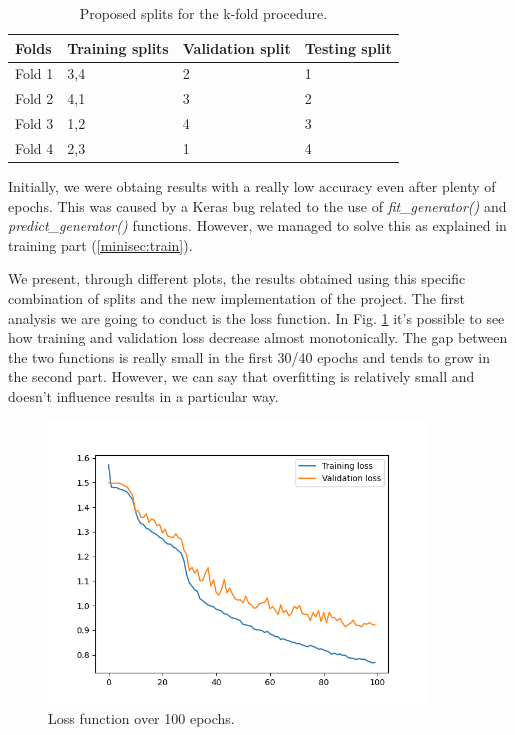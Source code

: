 \documentclass[11pt]{article}
\begin{document}
    

\begin{table}[h]
\caption{Proposed splits for the k-fold procedure.}
\centering
\begin{tabular}{l|lll}

Folds  & \multicolumn{1}{l|}{Training splits} & \multicolumn{1}{l|}{Validation split} & Testing split \\ \hline

Fold 1 & 3,4                                  & 2                                     & 1             \\

Fold 2 & 4,1                                  & 3                                     & 2             \\

Fold 3 & 1,2                                  & 4                                     & 3             \\
 
Fold 4 & 2,3                                  & 1                                     & 4            
\end{tabular}
\end{table}


\noindent
Initially, we were obtaing results with a really low accuracy even after plenty of epochs. This was caused by a Keras bug related to the use of \textit{fit\_generator()} and \textit{predict\_generator()} functions. However, we managed to solve this as explained in training part (\ref{minisec:train}). 

\noindent
We present, through different plots, the results obtained using this specific combination of splits and the new implementation of the project. The first analysis we are going to conduct is the loss function. In Fig. \ref{fig:loss} it's possible to see how training and validation loss decrease almost monotonically. The gap between the two functions is really small in the first 30/40 epochs and tends to grow in the second part. However, we can say that overfitting is relatively small and doesn't influence results in a particular way.

\begin{figure}[h!]
	\centering
	\includegraphics[width=10cm]{img/loss.png}
	\caption{Loss function over 100 epochs.}
	\label{fig:loss}
\end{figure}
\end{document}
